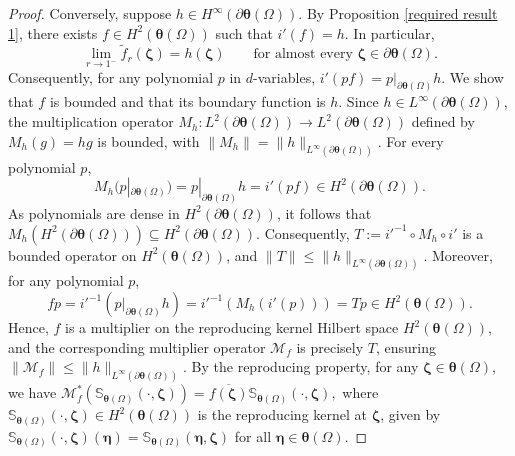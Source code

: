 \documentclass[12pt,reqno]{amsart}
\theoremstyle{remark}
\theoremstyle{definition}
\begin{document}
\begin{proof}
    Conversely, suppose $h\in H^\infty (\partial \boldsymbol \theta(\Omega)).$ By Proposition \ref{required result 1}, there exists $f\in H^2(\boldsymbol \theta(\Omega))$ such that $i'(f)=h.$ In particular, $$\lim_{r \to 1^-} \tilde{f}_r(\boldsymbol \zeta)=h(\boldsymbol \zeta)\qquad \text{for almost every } \boldsymbol \zeta \in \partial\boldsymbol \theta(\Omega).$$ Consequently, for any polynomial $p$ in $d$-variables, $i'(pf)=p|_{\partial\boldsymbol \theta(\Omega)} h.$
    We show that $f$ is bounded and that its boundary function is $h.$
    Since $h \in L^\infty(\partial\boldsymbol \theta(\Omega))$, the multiplication operator $M_{h}: L^2(\partial\boldsymbol \theta(\Omega)) \to L^2(\partial\boldsymbol \theta(\Omega))$ defined by $M_{h}(g)= h g$ is bounded, with $\|M_{h}\|=\|h\|_{L^\infty(\partial\boldsymbol \theta(\Omega))}.$
    For every polynomial $p$, $$M_{h}(p|_{\partial\boldsymbol \theta(\Omega)})=p|_{\partial\boldsymbol \theta(\Omega)} h= i'(pf)\in H^2(\partial\boldsymbol\theta(\Omega)).$$ 
    As polynomials are dense in $H^2(\partial\boldsymbol \theta(\Omega))$, it follows that $M_{h}(H^2(\partial\boldsymbol \theta(\Omega))) \subseteq H^2(\partial\boldsymbol \theta(\Omega)).$
    Consequently, $T:=i'^{-1} \circ M_{h}\circ i'$ is a bounded operator on $H^2(\boldsymbol \theta(\Omega))$, and $\|T\| \leq \|h\|_{L^\infty(\partial\boldsymbol \theta(\Omega))}.$
    Moreover, for any polynomial $p$, $$fp=i'^{-1}( p|_{\partial\boldsymbol\theta(\Omega)}h)=i'^{-1}(M_{h} (i'(p)))=Tp\in H^2(\boldsymbol \theta(\Omega)).$$ 
    Hence, $f$ is a multiplier on the reproducing kernel Hilbert space $H^2(\boldsymbol \theta(\Omega))$, and the corresponding multiplier operator $\mathcal{M}_f$ is precisely $T$, ensuring $\|\mathcal{M}_f\| \leq \|h\|_{L^\infty(\partial\boldsymbol \theta(\Omega))}.$ 
    By the reproducing property, for any $\boldsymbol \zeta\in \boldsymbol \theta(\Omega)$, we have $\mathcal{M}_f^*(\mathbb S_{\boldsymbol \theta(\Omega)}(\cdot, \boldsymbol{\zeta}))=\overline{f(\boldsymbol \zeta)} \mathbb S_{\boldsymbol \theta(\Omega)}(\cdot, \boldsymbol{\zeta}),$ where $\mathbb S_{\boldsymbol \theta(\Omega)}(\cdot, \boldsymbol{\zeta})\in H^2(\boldsymbol \theta(\Omega))$ is the reproducing kernel at $\boldsymbol \zeta$, given by $\mathbb S_{\boldsymbol \theta(\Omega)}(\cdot, \boldsymbol{\zeta})(\boldsymbol \eta)=\mathbb S_{\boldsymbol \theta(\Omega)}(\boldsymbol \eta, \boldsymbol{\zeta})$ for all $\boldsymbol \eta\in \boldsymbol \theta(\Omega).$ 

\end{proof}
\end{document}
